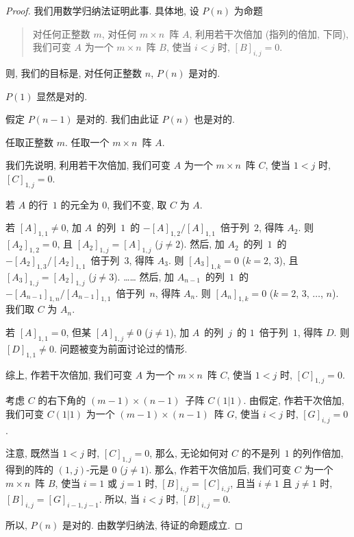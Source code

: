\documentclass[../libro.tex]{subfiles}
\begin{document}
\begin{proof}
    我们用数学归纳法证明此事.
    具体地, 设 \(P(n)\) 为命题
    \begin{quotation}
        对任何正整数 \(m\),
        对任何 \(m \times n\)~阵 \(A\),
        利用若干次倍加 (指列的倍加, 下同),
        我们可变 \(A\) 为一个 \(m \times n\)~阵 \(B\),
        使当 \(i < j\) 时,
        \([B]_{i,j} = 0\).
    \end{quotation}
    则, 我们的目标是,
    对任何正整数 \(n\), \(P(n)\) 是对的.

    \(P(1)\) 显然是对的.

    假定 \(P(n-1)\) 是对的.
    我们由此证 \(P(n)\) 也是对的.

    任取正整数 \(m\).
    任取一个 \(m \times n\)~阵 \(A\).

    我们先说明, 利用若干次倍加,
    我们可变 \(A\) 为一个 \(m \times n\)~阵 \(C\),
    使当 \(1 < j\) 时, \([C]_{1,j} = 0\).

    若 \(A\) 的行~\(1\) 的元全为 \(0\),
    我们不变, 取 \(C\) 为 \(A\).

    若 \([A]_{1,1} \neq 0\),
    加 \(A\)~的列~\(1\)~的
    \(-[A]_{1,2} / [A]_{1,1}\)~倍于列~\(2\),
    得阵 \(A_2\).
    则 \([A_2]_{1,2} = 0\),
    且 \([A_2]_{1,j} = [A]_{1,j}\)
    (\(j \neq 2\)).
    然后, 加 \(A_2\)~的列~\(1\)~的
    \(-[A_2]_{1,3} / [A_2]_{1,1}\)~倍于列~\(3\),
    得阵 \(A_3\).
    则 \([A_3]_{1,k} = 0\)
    (\(k = 2\), \(3\)),
    且 \([A_3]_{1,j} = [A_2]_{1,j}\)
    (\(j \neq 3\)).
    ……
    然后, 加 \(A_{n-1}\)~的列~\(1\)~的
    \(-[A_{n-1}]_{1,n} / [A_{n-1}]_{1,1}\)~倍于列~\(n\),
    得阵 \(A_n\).
    则 \([A_n]_{1,k} = 0\)
    (\(k = 2\), \(3\), \(\dots\), \(n\)).
    我们取 \(C\) 为 \(A_n\).

    若 \([A]_{1,1} = 0\),
    但某 \([A]_{1,j} \neq 0\)
    (\(j \neq 1\)),
    加 \(A\)~的列~\(j\)~的 \(1\)~倍于列~\(1\),
    得阵 \(D\).
    则 \([D]_{1,1} \neq 0\).
    问题被变为前面讨论过的情形.

    综上, 作若干次倍加,
    我们可变 \(A\) 为一个 \(m \times n\)~阵 \(C\),
    使当 \(1 < j\) 时, \([C]_{1,j} = 0\).

    考虑 \(C\) 的右下角的 \((m-1) \times (n-1)\)~子阵
    \(C(1|1)\).
    由假定, 作若干次倍加, 我们可变 \(C(1|1)\) 为一个
    \((m-1) \times (n-1)\)~阵 \(G\),
    使当 \(i < j\) 时, \([G]_{i,j} = 0\).

    注意, 既然当 \(1 < j\) 时, \([C]_{1,j} = 0\),
    那么, 无论如何对 \(C\) 的不是列~\(1\) 的列作倍加,
    得到的阵的 \((1, j)\)-元是 \(0\) (\(j \neq 1\)).
    那么, 作若干次倍加后,
    我们可变 \(C\) 为一个 \(m \times n\)~阵 \(B\),
    使当 \(i = 1\) 或 \(j = 1\) 时,
    \([B]_{i,j} = [C]_{i,j}\),
    且当 \(i \neq 1\) 且 \(j \neq 1\) 时,
    \([B]_{i,j} = [G]_{i-1,j-1}\).
    所以, 当 \(i < j\) 时, \([B]_{i,j} = 0\).

    所以, \(P(n)\) 是对的.
    由数学归纳法, 待证的命题成立.
\end{proof}
\end{document}
